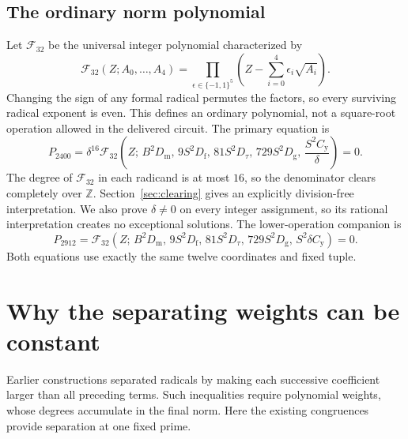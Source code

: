 \documentclass[11pt,a4paper]{article}
\theoremstyle{remark}\newtheorem{remark}[theorem]{Remark}
\newcommand{\Z}{\mathbb Z}\newcommand{\Q}{\mathbb Q}\newcommand{\N}{\mathbb N}
\newcommand{\Fn}{\mathcal F_{32}}
\newcommand{\Dm}{D_{\mathrm m}}\newcommand{\Df}{D_{\mathrm f}}
\newcommand{\Dt}{D_{\tau}}\newcommand{\Dg}{D_{\mathrm g}}
\newcommand{\Cc}{C_{\mathrm y}}
\newcommand{\primary}{P_{2400}}\newcommand{\companion}{P_{2912}}
\begin{document}
\subsection{The ordinary norm polynomial}
Let $\Fn$ be the universal integer polynomial characterized by
\begin{equation}\label{eq:norm}
 \Fn(Z;A_0,\ldots,A_4)
 =
 \prod_{\epsilon\in\{-1,1\}^5}
 \left(Z-\sum_{i=0}^4\epsilon_i\sqrt{A_i}\right).
\end{equation}
Changing the sign of any formal radical permutes the factors, so every
surviving radical exponent is even. This defines an ordinary polynomial,
not a square-root operation allowed in the delivered circuit.
The primary equation is
\begin{equation}\label{eq:primary}
\boxed{\;
 \primary=
 \delta^{16}\Fn\left(
 Z;\,B^2\Dm,\,9S^2\Df,\,81S^2\Dt,\,729S^2\Dg,\,
 \frac{S^2\Cc}{\delta}
 \right)=0 .
 \;}
\end{equation}
The degree of $\Fn$ in each radicand is at most $16$, so the denominator
clears completely over $\Z$. Section~\ref{sec:clearing} gives an explicitly
division-free interpretation. We also prove $\delta\ne0$ on every
integer assignment, so its rational interpretation creates no exceptional
solutions. The lower-operation companion is
\begin{equation}\label{eq:companion}
\boxed{\;
 \companion=
 \Fn\left(
 Z;\,B^2\Dm,\,9S^2\Df,\,81S^2\Dt,\,729S^2\Dg,\,
 S^2\delta\Cc
 \right)=0 .
 \;}
\end{equation}
Both equations use exactly the same twelve coordinates and fixed tuple.

\section{Why the separating weights can be constant}\label{sec:valuation}
Earlier constructions separated radicals by making each successive
coefficient larger than all preceding terms. Such inequalities require
polynomial weights, whose degrees accumulate in the final norm. Here
the existing congruences provide separation at one fixed prime.
\end{document}
